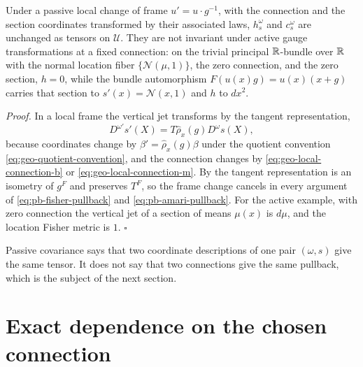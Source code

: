 Under a passive local change of frame \(u'=u\cdot g^{-1}\), with the connection and the section
coordinates transformed by their associated laws, \(h_s^\omega\) and \(c_s^\omega\) are unchanged as
tensors on \(\mathcal U\). They are not invariant under active gauge transformations at a fixed
connection: on the trivial principal \(\mathbb R\)-bundle over \(\mathbb R\) with the normal location fiber
\(\{\mathcal N(\mu,1)\}\), the zero connection, and the zero section, \(h=0\), while the bundle
automorphism \(F(u(x)g)=u(x)(x+g)\) carries that section to \(s'(x)=\mathcal N(x,1)\) and \(h\) to
\(dx^2\). 

\noindent\emph{Proof.}
In a local frame the vertical jet transforms by the tangent representation,
\begin{equation}
D^{\omega'}s'(X)
=T\widehat\rho_x(g)D^\omega s(X),
\label{eq:pb-covariant-jet-gauge-law}
\end{equation}
because coordinates change by \(\beta'=\widehat\rho_x(g)\beta\) under the quotient convention
\eqref{eq:geo-quotient-convention}, and the connection changes by \eqref{eq:geo-local-connection-b}
or \eqref{eq:geo-local-connection-m}. By  the tangent
representation is an isometry of \(g^F\) and preserves \(T^F\), so the frame change cancels in every
argument of \eqref{eq:pb-fisher-pullback} and \eqref{eq:pb-amari-pullback}. For the active example,
with zero connection the vertical jet of a section of means \(\mu(x)\) is \(d\mu\), and the location
Fisher metric is \(1\). \hfill$\square$

Passive covariance says that two coordinate descriptions of one pair \((\omega,s)\) give the same
tensor. It does not say that two connections give the same pullback, which is the subject of the
next section.

\section{Exact dependence on the chosen connection}
\label{sec:pb-connection-dependence}

